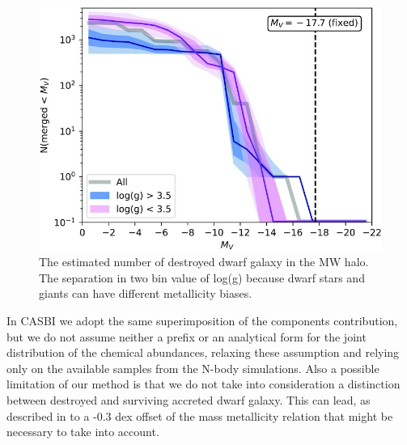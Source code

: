 \begin{figure}[h]
    \centering
    \includegraphics[width=1\textwidth]{./figure/unraveling_mass_spectrum.jpeg}
    \caption{The estimated number of destroyed dwarf galaxy in the MW halo. The separation in two bin value of log(g) because dwarf stars and giants can have different metallicity biases. }
    \label{fig:unraveling_mass_spectrum}
\end{figure}

In CASBI we adopt the same superimposition of the components contribution, but we do not assume neither a prefix or an analytical form for the joint distribution of the chemical abundances, relaxing these assumption and relying only on the available samples from the N-body simulations. Also a possible limitation of our method is that we do not take into consideration a distinction between destroyed and surviving accreted dwarf galaxy. This can lead, as described in \cite{naiduEvidenceH3Survey2020} to a -0.3 dex offset of the mass metallicity \cite{kirbyMULTIELEMENTABUNDANCEMEASUREMENTS2011} relation that might be necessary to take into account.
